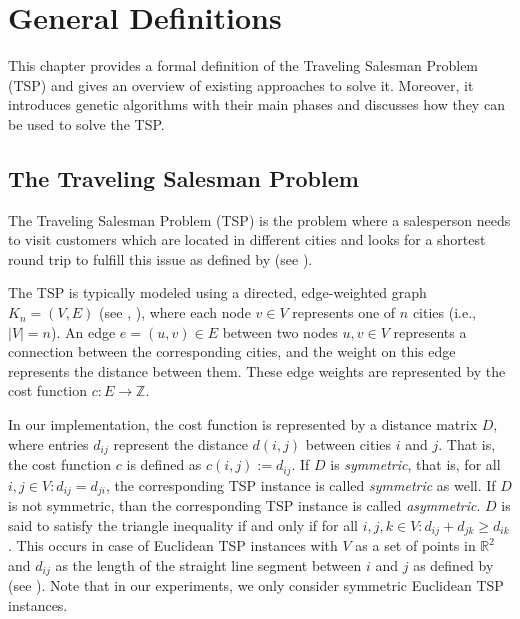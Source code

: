 \section{General Definitions}
\label{sec:general_definitions}

This chapter provides a formal definition of the Traveling Salesman Problem (TSP) and gives an overview of existing approaches to solve it. Moreover, it introduces genetic algorithms with their main phases and discusses how they can be used to solve the TSP.\par 

\subsection{The Traveling Salesman Problem}
\label{subsec:tsp}

The Traveling Salesman Problem (TSP) is the problem where a salesperson needs to visit customers which are located in different cities and looks for a shortest round trip to fulfill this issue as defined by \citeauthor{hoos2004stochastic} (see \cite{hoos2004stochastic}). \par 

The TSP is typically modeled using a directed, edge-weighted graph $K_{n} = (V, E)$ (see \cite{hoos2004stochastic}, \cite{knust2020script}), where each node $v \in V$ represents one of $n$ cities (i.e., $|V| = n$). An edge $e = (u, v) \in E$ between two nodes $u, v \in V$  represents a connection between the corresponding cities, and the weight on this edge represents the distance between them. These edge weights are represented by the cost function $c : E \rightarrow \mathbb{Z}$. \par 
In our implementation, the cost function is represented by a distance matrix $D$, where entries $d_{ij}$ represent the distance $d(i, j)$ between cities $i$ and $j$. That is, the cost function $c$ is defined as $c(i, j) := d_{ij}$. If $D$ is \textit{symmetric}, that is, for all $ i, j \in V: d_{ij} = d_{ji}$, the corresponding TSP instance is called \textit{symmetric} as well.  If $D$ is not symmetric, than the corresponding TSP instance is called \textit{asymmetric}. $D$ is said to satisfy the triangle inequality if and only if for all $i, j, k \in V: d_{ij} + d_{jk} \geq d_{ik}$. This occurs in case of Euclidean TSP instances with $V$ as a set of points in $\mathbb{R}^{2}$  and $d_{ij}$ as the length of the straight line segment between $i$ and $j$ as defined by \citeauthor{laporte1992traveling} (see \cite{laporte1992traveling}). Note that in our experiments, we only consider symmetric Euclidean TSP instances.

